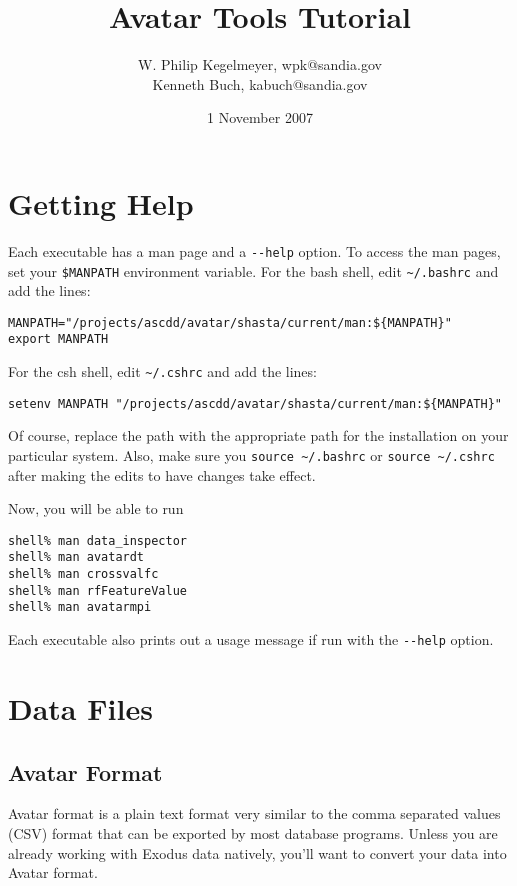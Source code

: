 \documentclass{article}
\begin{document}
\title{Avatar Tools Tutorial}
\author{W. Philip Kegelmeyer, wpk@sandia.gov\\Kenneth Buch, kabuch@sandia.gov}
\date{1 November 2007}

\maketitle
\tableofcontents

\newpage

\section{Getting Help}

Each executable has a man page and a \verb=--help= option. To access the man pages,
set your \verb=$MANPATH= environment variable. For the bash shell, edit \verb=~/.bashrc=
and add the lines:

\begin{verbatim}
MANPATH="/projects/ascdd/avatar/shasta/current/man:${MANPATH}"
export MANPATH
\end{verbatim}

For the csh shell, edit \verb=~/.cshrc= and add the lines:

\begin{verbatim}
setenv MANPATH "/projects/ascdd/avatar/shasta/current/man:${MANPATH}"
\end{verbatim}

Of course, replace the path with the appropriate path for the installation on your particular system. Also,
make sure you \verb=source ~/.bashrc= or \verb=source ~/.cshrc= after making the edits to have changes
take effect.

Now, you will be able to run

\begin{verbatim}
shell% man data_inspector
shell% man avatardt
shell% man crossvalfc
shell% man rfFeatureValue
shell% man avatarmpi
\end{verbatim}

Each executable also prints out a usage message if run with the \verb=--help= option.

\section{Data Files}

\subsection{Avatar Format}
Avatar format is a plain text format very similar to the comma separated values (CSV) format that
can be exported by most database programs. Unless you are already working with Exodus data natively, you'll
want to convert your data into Avatar format. 
\end{document}
